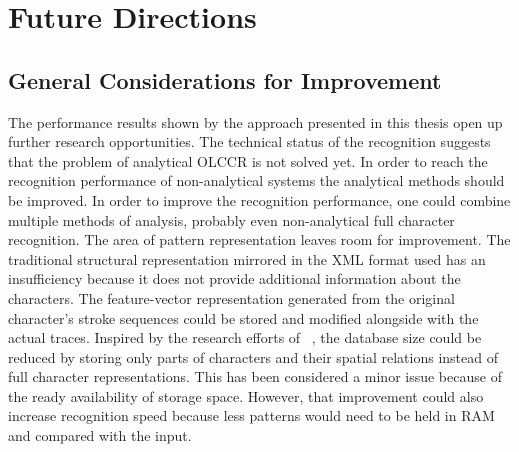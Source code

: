 

\section{Future Directions}
\label{sec:conclusion:futurework}


\subsection{General Considerations for Improvement}
\label{sec:conclusion:generalconsiderationsforimprovement}
The performance results shown by the approach presented in this thesis
open up further research opportunities. The technical status of the recognition
suggests that the problem of analytical OLCCR is not solved yet.
In order to reach the recognition performance of non-analytical systems
the analytical methods should be improved.
In order to improve the recognition performance, one could combine multiple 
methods of analysis, probably even non-analytical full character recognition.
The area of pattern representation leaves room for improvement. 
The traditional structural representation mirrored in the XML format used
has an insufficiency because it does not provide additional information about
the characters. The feature-vector representation generated from the original
character's stroke sequences could be stored and modified alongside with
the actual traces.
Inspired by the research efforts of 
~\citeyear{ChenLee1996}, the database size could be
reduced by storing only parts of characters and their spatial relations
instead of full character representations. This has been considered 
a minor issue because of the ready availability of storage space.
However, that improvement could also increase recognition speed because
less patterns would need to be held in RAM and compared with the input.

